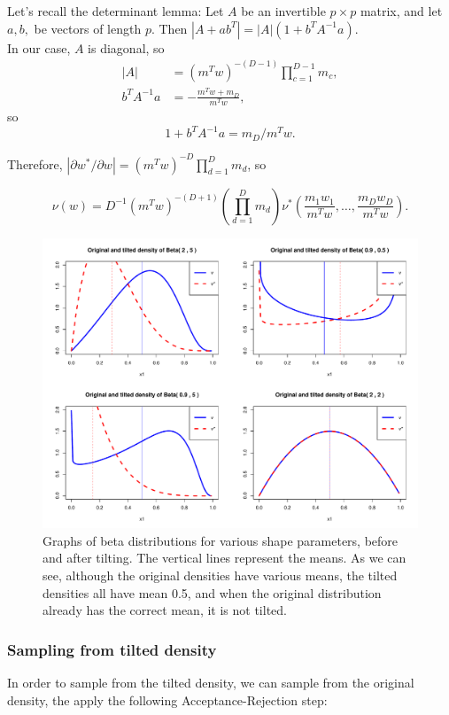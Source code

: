\documentclass[10pt]{report}
\begin{document}
Let's recall the determinant lemma:
Let $A$ be an invertible $ p \times p $ matrix, and let $a,b,$ be vectors of length $p$.
Then $|A + ab^T| = |A|(1 + b^TA^{-1}a)$. \\

In our case, $A$ is diagonal, so
\begin{align*}
|A| &= (m^Tw)^{-(D-1)} \prod_{c=1}^{D-1}m_c , \\
b^TA^{-1}a &= -\frac{m^Tw + m_D}{m^Tw},
\end{align*}
so 
$$1 + b^TA^{-1}a = m_D/m^Tw.$$

Therefore, $|\partial w^*/\partial w| = (m^Tw)^{-D} \prod_{d=1}^Dm_d$, so

$$
\nu (w) = D^{-1}(m^Tw)^{-(D+1)} \left(\prod_{d=1}^D m_d\right) \nu^* \left(\frac{m_1w_1}{m^Tw},\ldots,\frac{m_Dw_D}{m^Tw}\right).
$$

\begin{figure}[h]
\centering
\includegraphics[width=\textwidth]{density_tilt.pdf}
\caption{Graphs of beta distributions for various shape parameters, before and after tilting. The vertical lines represent the means. As we can see, although the original densities have various means, the tilted densities all have mean 0.5, and when the original distribution already has the correct mean, it is not tilted.}
\label{fig:density_tilt}
\end{figure}

\subsubsection{Sampling from tilted density}
In order to sample from the tilted density, we can sample from the original density, the apply the following Acceptance-Rejection step:
\end{document}
